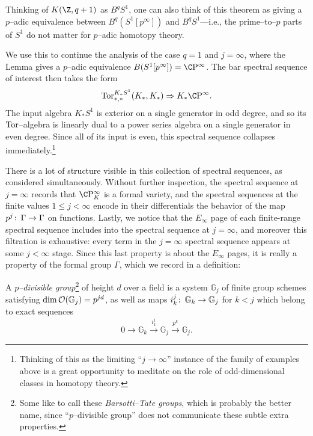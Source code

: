 \begin{remark}
Thinking of \(K(\Z, q+1)\) as \(B^q S^1\), one can also think of this theorem as giving a \(p\)--adic equivalence between \(B^q(S^1[p^\infty])\) and \(B^q S^1\)---i.e., the prime--to--\(p\) parts of \(S^1\) do not matter for \(p\)--adic homotopy theory.
\end{remark}

We use this to continue the analysis of the case \(q = 1\) and \(j = \infty\), where the Lemma gives a \(p\)--adic equivalence \(B(S^1[p^\infty]) = \CP^\infty\).  The bar spectral sequence of interest then takes the form \[\Tor^{K_* S^1}_{*, *}(K_*, K_*) \Rightarrow K_* \CP^\infty.\]  The input algebra \(K_* S^1\) is exterior on a single generator in odd degree, and so its \(\operatorname{Tor}\)--algebra is linearly dual to a power series algebra on a single generator in even degree.  Since all of its input is even, this spectral sequence collapses immediately.\footnote{Thinking of this as the limiting ``\(j \to \infty\)'' instance of the family of examples above is a great opportunity to meditate on the role of odd-dimensional classes in homotopy theory.}

There is a lot of structure visible in this collection of spectral sequences, as considered simultaneously.  Without further inspection, the spectral sequence at \(j = \infty\) records that \(\CP^\infty_K\) is a formal variety, and the spectral sequences at the finite values \(1 \le j < \infty\) encode in their differentials the behavior of the map \(p^j\colon\thinspace \Gamma \to \Gamma\) on functions.  Lastly, we notice that the \(E_\infty\) page of each finite-range spectral sequence includes into the spectral sequence at \(j = \infty\), and moreover this filtration is exhaustive: every term in the \(j = \infty\) spectral sequence appears at some \(j < \infty\) stage.  Since this last property is about the \(E_\infty\) pages, it is really a property of the formal group \(\Gamma\), which we record in a definition:

\begin{definition}\label{DefnPDivGp}
A \textit{\(p\)--divisible group}\footnote{Some like to call these \textit{Barsotti--Tate groups}, which is probably the better name, since ``\(p\)--divisible group'' does not communicate these subtle extra properties.} of height \(d\) over a field is a system \(\mathbb G_j\) of finite group schemes satisfying \(\operatorname{dim} \mathcal{O}(\mathbb G_j) = p^{jd}\), as well as maps \(i_k^j\colon\thinspace \mathbb G_k \to \mathbb G_j\) for \(k < j\) which belong to exact sequences \[0 \to \mathbb G_k \xrightarrow{i_k^j} \mathbb G_j \xrightarrow{p^k} \mathbb G_j.\]
\end{definition}

